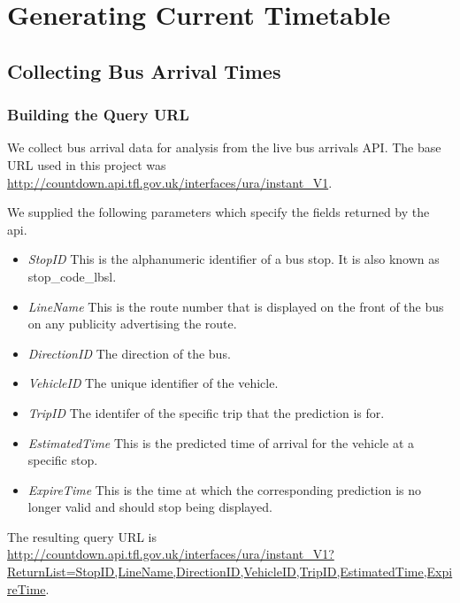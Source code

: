 \section{Generating Current Timetable}
\label{sec:current_timetable_generation}

\subsection{Collecting Bus Arrival Times}
\label{sec:collecting_arrival_times}

\subsubsection{Building the Query URL}
\par We collect bus arrival data for analysis from the live bus arrivals API. The base URL used in this project was \url{http://countdown.api.tfl.gov.uk/interfaces/ura/instant_V1}.

\par We supplied the following parameters which specify the fields returned by the \acrshort{api}.

\begin{itemize}
  \item \textit{StopID} This is the alphanumeric identifier of a bus stop. It is also known as stop\_code\_lbsl.
  \item \textit{LineName} This is the route number that is displayed on the front of the bus on any publicity advertising the route.
  \item \textit{DirectionID} The direction of the bus.
  \item \textit{VehicleID} The unique identifier of the vehicle.
  \item \textit{TripID} The identifer of the specific trip that the prediction is for.
  \item \textit{EstimatedTime} This is the predicted time of arrival for the vehicle at a specific stop.
  \item \textit{ExpireTime} This is the time at which the corresponding prediction is no longer valid and should stop being displayed.
\end{itemize}

\par The resulting query URL is \sloppy \url{http://countdown.api.tfl.gov.uk/interfaces/ura/instant_V1?ReturnList=StopID,LineName,DirectionID,VehicleID,TripID,EstimatedTime,ExpireTime}.

